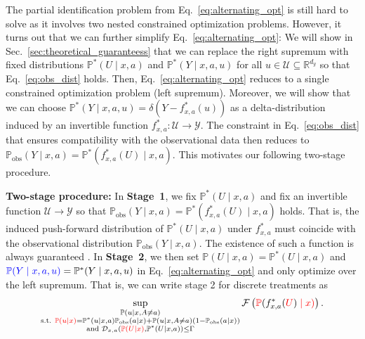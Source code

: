 \documentclass{article} %
\newcommand{\R}{\mathbb{R}}
\theoremstyle{definition}
\theoremstyle{plain}
\begin{document}
The partial identification problem from Eq.~\eqref{eq:alternating_opt} is still hard to solve as it involves two nested constrained optimization problems. However, it turns out that we can further simplify Eq.~\eqref{eq:alternating_opt}: We will show in Sec.~\ref{sec:theoretical_guaranteess} that we can replace the right supremum with fixed distributions $\mathbb{P}^\ast(U \mid x, a)$ and $\mathbb{P}^\ast(Y \mid x, a, u)$ for all $u \in \mathcal{U} \subseteq \R^{d_y}$ so that Eq.~\eqref{eq:obs_dist} holds. Then, Eq.~\eqref{eq:alternating_opt} reduces to a single constrained optimization problem (left supremum). Moreover, we will show that we can choose $\mathbb{P}^\ast(Y \mid x, a, u) = \delta(Y - f^\ast_{x, a}(u))$ as a delta-distribution induced by an invertible function $f^\ast_{x, a} \colon \mathcal{U} \to \mathcal{Y}$. The constraint in Eq.~\eqref{eq:obs_dist} that ensures compatibility with the observational data then reduces to $\mathbb{P}_\mathrm{obs}(Y \mid x, a) =  \mathbb{P}^\ast(f^\ast_{x, a}(U) \mid x, a)$. This motivates our following two-stage procedure.

\textbf{Two-stage procedure:} In \textbf{Stage~1}, we fix $\mathbb{P}^\ast(U \mid x, a)$ and fix an invertible function $\mathcal{U} \to \mathcal{Y}$ so that $\mathbb{P}_\mathrm{obs}(Y \mid x, a) =  \mathbb{P}^\ast(f^\ast_{x, a}(U) \mid x, a)$ holds. That is, the induced push-forward distribution of $\mathbb{P}^\ast(U \mid x, a)$ under $f^\ast_{x, a}$ must coincide with the observational distribution $\mathbb{P}_\mathrm{obs}(Y \mid x, a)$. The existence of such a function is always guaranteed \citep{Chen.2000}. In \textbf{Stage~2}, we then set $\mathbb{P}(U \mid x, a) = \mathbb{P}^\ast(U \mid x, a)$ and $\color{blue}\mathbb{P}(Y \mid x, a, u) \color{black}= \mathbb{P}^\ast(Y \mid x, a, u)$ in Eq.~\eqref{eq:alternating_opt} and only optimize over the left supremum. That is, we can write stage 2 for discrete treatments as
\begin{equation}
 \sup_{\color{black}\substack{\mathbb{P}(u \mid x, A \neq a) \\ \text{s.t. } \color{red}\mathbb{P}(u \mid x) \color{black}= \mathbb{P}^\ast(u \mid x, a) \mathbb{P}_\mathrm{obs}(a \mid x) + \mathbb{P}(u \mid x, A \neq a) \color{black} (1 - \mathbb{P}_\mathrm{obs}(a \mid x)) \\ \text{and }\mathcal{D}_{x, a}( \color{red}\mathbb{P}(U \mid x) \color{black}, \mathbb{P}^\ast(U \mid x, a)) \leq \Gamma }}\color{black}\mathcal{F} \left(\color{red}\mathbb{P}\color{black}(f^\ast_{x, a}(\color{red}U\color{black}) \color{red} \mid x) \color{black} \right).
\end{equation}
\vspace{-0.2cm}
\end{document}
